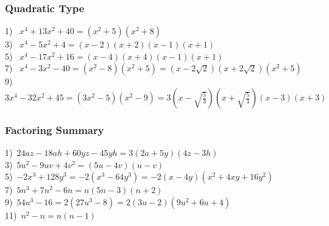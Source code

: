 \documentclass[11pt]{book}
\newcommand{\tmstrong}[1]{\textbf{#1}}
\theoremstyle{definition}  %
\newcommand{\pp}{\par~\par}
\begin{document}
\subsubsection{Quadratic Type}


  1)~ $x^4 +13x^2+40=(x^2+5)(x^2+8)$\\
  3)~ $x^4-5x^2+4=(x-2)(x+2)(x-1)(x+1)$\\
  5)~ $x^4 -17x^2+16=(x-4)(x+4)(x-1)(x+1)$\\
  7)~ $x^4 -3x^2-40=(x^2-8)(x^2+5)=(x-2\sqrt{2})(x+2\sqrt{2})(x^2+5)$\\
  9)~ $3x^4 -32x^2+45=(3x^2-5)(x^2-9)=3\left(x-\sqrt{\frac{5}{3}}\right)\left(x+\sqrt{\frac{5}{3}}\right)(x-3)(x+3)$
  

\subsubsection{Factoring Summary}


  1)~$24 a z - 18 a h + 60 y z - 45 y h=3(2a+5y)(4z-3h)$\\
  3)~$5 u^2 - 9 u v + 4 v^2=(5u-4v)(u-v)$\\
  5)~$- 2 x^3 + 128 y^3=-2(x^3-64y^3)=-2(x-4y)(x^2+4xy+16y^2)$\\
  7)~$5 n^3 + 7 n^2 - 6 n=n(5n-3)(n+2)$\\
  9)~$54 u^3 - 16=2(27u^3-8)=2(3u-2)(9u^2+6u+4)$\\
  11)~$n^2 - n=n(n-1)$\\
\end{document}

